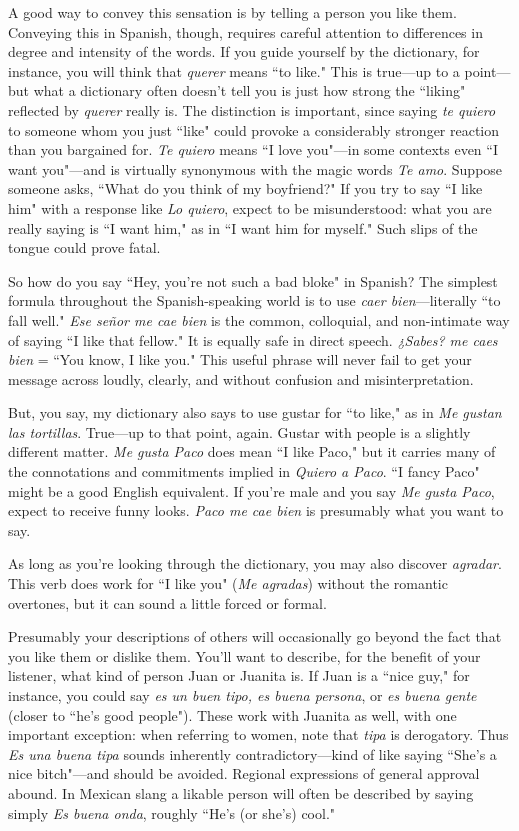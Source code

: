 A good way to convey this sensation is by telling a person you
like them. Conveying this in Spanish, though, requires careful attention to differences in degree and intensity of the words. If you guide
yourself by the dictionary, for instance, you will think that \emph{querer}
means ``to like." This is true---up to a point---but what a dictionary
often doesn't tell you is just how strong the ``liking" reflected by
\emph{querer} really is. The distinction is important, since saying \emph{te quiero} to
someone whom you just ``like" could provoke a considerably stronger
reaction than you bargained for. \emph{Te quiero} means ``I love you"---in
some contexts even ``I want you"---and is virtually synonymous with
the magic words \emph{Te amo}. Suppose someone asks, ``What do you think
of my boyfriend?" If you try to say ``I like him" with a response like \emph{Lo
	quiero}, expect to be misunderstood: what you are really saying is ``I
want him," as in ``I want him for myself." Such slips of the tongue
could prove fatal.

So how do you say ``Hey, you're not such a bad bloke" in Spanish? The simplest formula throughout the Spanish-speaking world is to
use \emph{caer bien}---literally ``to fall well." \emph{Ese señor me cae bien} is the common, colloquial, and non-intimate way of saying ``I like that fellow." It
is equally safe in direct speech. \emph{¿Sabes? me caes bien} = ``You know, I
like you." This useful phrase will never fail to get your message across
loudly, clearly, and without confusion and misinterpretation.

But, you say, my dictionary also says to use gustar for ``to
like," as in \emph{Me gustan las tortillas}. True---up to that point, again. Gustar with people is a slightly different matter. \emph{Me gusta Paco} does mean
``I like Paco," but it carries many of the connotations and commitments implied in \emph{Quiero a Paco}. ``I fancy Paco" might be a good English equivalent. If you're male and you say \emph{Me gusta Paco}, expect to
receive funny looks. \emph{Paco me cae bien} is presumably what you want
to say.

As long as you're looking through the dictionary, you may also
discover \emph{agradar}. This verb does work for ``I like you" (\emph{Me agradas})
without the romantic overtones, but it can sound a little forced or
formal.

Presumably your descriptions of others will occasionally go
beyond the fact that you like them or dislike them. You'll want to
describe, for the benefit of your listener, what kind of person Juan or
Juanita is. If Juan is a ``nice guy," for instance, you could say \emph{es un
	buen tipo, es buena persona}, or \emph{es buena gente} (closer to ``he's good
people"). These work with Juanita as well, with one important exception: when referring to women, note that \emph{tipa} is derogatory. Thus \emph{Es
	una buena tipa} sounds inherently contradictory---kind of like saying
``She's a nice bitch"---and should be avoided. Regional expressions
of general approval abound. In Mexican slang a likable person will often be described by saying simply \emph{Es buena onda}, roughly ``He's (or
she's) cool."

